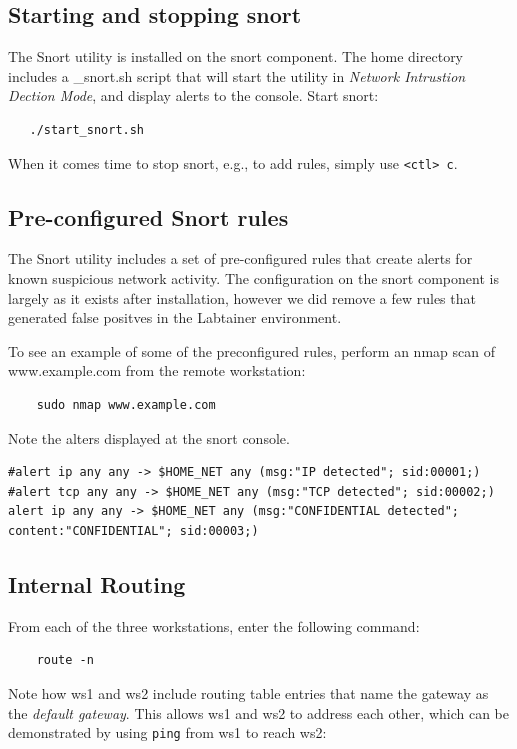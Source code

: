 \subsection{Starting and stopping snort}
The Snort utility is installed on the snort component.  The home directory includes a {\ttstart\_snort.sh}
script that will start the utility in \textit{Network Intrustion Dection Mode}, and display alerts
to the console.  Start snort:
\begin{verbatim}
   ./start_snort.sh
\end{verbatim}
When it comes time to stop snort, e.g., to add rules, simply use {\tt <ctl> c}.

\subsection{Pre-configured Snort rules}
The Snort utility includes a set of pre-configured rules that create alerts for known
suspicious network activity. The configuration on the snort component is largely as it
exists after installation, however we did remove a few rules that generated false positves in the
Labtainer environment.

To see an example of some of the preconfigured rules, perform an nmap scan of www.example.com from the remote
workstation:
\begin{verbatim}
    sudo nmap www.example.com
\end{verbatim}
\noindent Note the alters displayed at the snort console.


\begin{verbatim}
#alert ip any any -> $HOME_NET any (msg:"IP detected"; sid:00001;)
#alert tcp any any -> $HOME_NET any (msg:"TCP detected"; sid:00002;)
alert ip any any -> $HOME_NET any (msg:"CONFIDENTIAL detected"; content:"CONFIDENTIAL"; sid:00003;)
\end{verbatim}

\subsection{Internal Routing}
From each of the three workstations, enter the following command:
\begin{verbatim}
    route -n
\end{verbatim}
\noindent Note how ws1 and ws2 include routing table entries that name the
gateway as the \textit{default gateway}.  This allows ws1 and ws2 to address each other, which 
can be demonstrated by using \texttt{ping} from ws1 to reach ws2:

